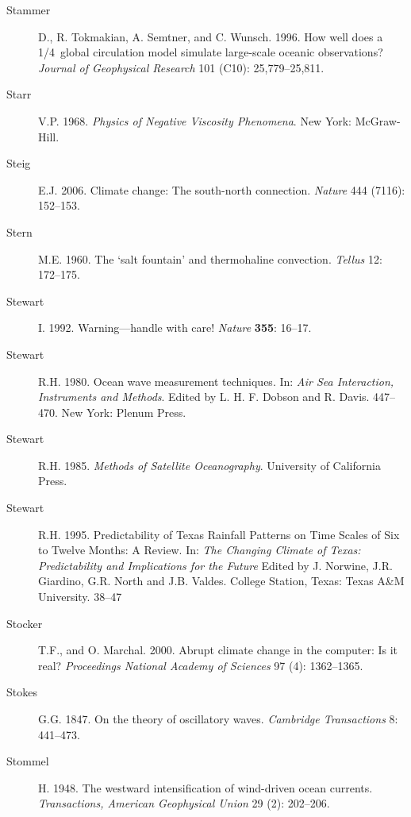 \begin{description}
\item [Stammer]D., R. Tokmakian, A. Semtner, and C. Wunsch. 1996. How
  well does a 1/4\degrees\ global circulation model simulate
  large-scale oceanic observations? \textit{Journal of Geophysical
    Research} 101 (C10): 25,779--25,811.

\item [Starr]V.P. 1968. \textit{Physics of Negative Viscosity
  Phenomena}.  New York: McGraw-Hill.

\item [Steig]E.J. 2006. Climate change: The south-north
  connection. \textit{Nature} 444 (7116): 152--153.

\item [Stern]M.E. 1960. The `salt fountain' and thermohaline
  convection. \textit{Tellus} 12: 172--175.

\item [Stewart]I. 1992. Warning---handle with care! \textit{Nature}
  \textbf{355}: 16--17.

\item [Stewart]R.H. 1980. Ocean wave measurement techniques. In:
  \textit{Air Sea Interaction, Instruments and Methods}. Edited by
  L. H. F. Dobson and R. Davis.  447--470. New York: Plenum Press.

\item [Stewart]R.H. 1985. \textit{Methods of Satellite
  Oceanography}. University of California Press.

\item [Stewart]R.H. 1995. Predictability of Texas Rainfall Patterns on
  Time Scales of Six to Twelve Months: A Review. In: \textit{The
    Changing Climate of Texas: Predictability and Implications for the
    Future} Edited by J. Norwine, J.R.  Giardino, G.R. North and
  J.B. Valdes. College Station, Texas: Texas A\&M University. 38--47

\item [Stocker]T.F., and O. Marchal. 2000. Abrupt climate change in
  the computer: Is it real? \textit{Proceedings National Academy of
    Sciences} 97 (4): 1362--1365.

\item [Stokes]G.G. 1847. On the theory of oscillatory
  waves. \textit{Cambridge Transactions} 8: 441--473.

\item [Stommel]H. 1948. The westward intensification of wind-driven
  ocean currents. \textit{Transactions, American Geophysical Union} 29
  (2): 202--206.


\end{description}

